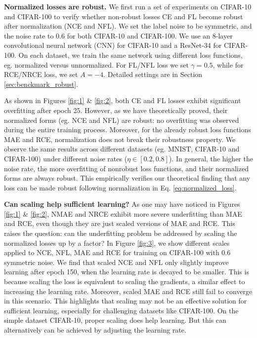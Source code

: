 \documentclass{article}
\begin{document}
\noindent\textbf{Normalized losses are robust.}
We first run a set of experiments on CIFAR-10 and CIFAR-100 to verify whether non-robust losses CE and FL become robust after normalization (NCE and NFL). We set the label noise to be symmetric, and the noise rate to 0.6 for both CIFAR-10 and CIFAR-100. We use an 8-layer convolutional neural network (CNN) for CIFAR-10 and a ResNet-34 \cite{he2016deep} for CIFAR-100. On each dataset, we train the same network using different loss functions, eg. normalized versus unnormalized. For FL/NFL loss we set $\gamma=0.5$, while for RCE/NRCE loss, we set $A=-4$. 
Detailed settings are in Section \ref{sec:benckmark_robust}.

As shown in Figures \ref{fig:1} \& \ref{fig:2}, both CE and FL losses exhibit significant overfitting after epoch 25. However, as we have theoretically proved, their normalized forms (eg. NCE and NFL) are robust: no overfitting was observed during the entire training process. Moreover, for the already robust loss functions MAE and RCE, normalization does not break their robustness property. We observe the same results across different datasets (eg. MNIST, CIFAR-10 and CIFAR-100) under different noise rates ($\eta \in [0.2, 0.8]$). In general, the higher the noise rate, the more overfitting of nonrobust loss functions, and their normalized forms are always robust. This empirically verifies our theoretical finding that any loss can be made robust following normalization in Eq. \eqref{eq:normalized_loss}.

\noindent\textbf{Can scaling help sufficient learning?}
As one may have noticed in Figures \ref{fig:1} \& \ref{fig:2}, NMAE and NRCE exhibit more severe underfitting than MAE and RCE, even though they are just scaled versions of MAE and RCE. This raises the question: can the underfitting problem be addressed by scaling the normalized losses up by a factor?
In Figure \ref{fig:3}, we show different scales applied to NCE, NFL, MAE and RCE for training on CIFAR-100 with 0.6 symmetric noise. We find that scaled NCE and NFL only slightly improve learning after epoch 150, when the learning rate is decayed to be smaller. This is because scaling the loss is equivalent to scaling the gradients, a similar effect to increasing the learning rate. Moreover, scaled MAE and RCE still fail to converge in this scenario.
This highlights that scaling may not be an effective solution for sufficient learning, especially for challenging datasets like CIFAR-100. On the simple dataset CIFAR-10, proper scaling does help learning. But this can alternatively can be achieved by adjusting the learning rate.
\end{document}
